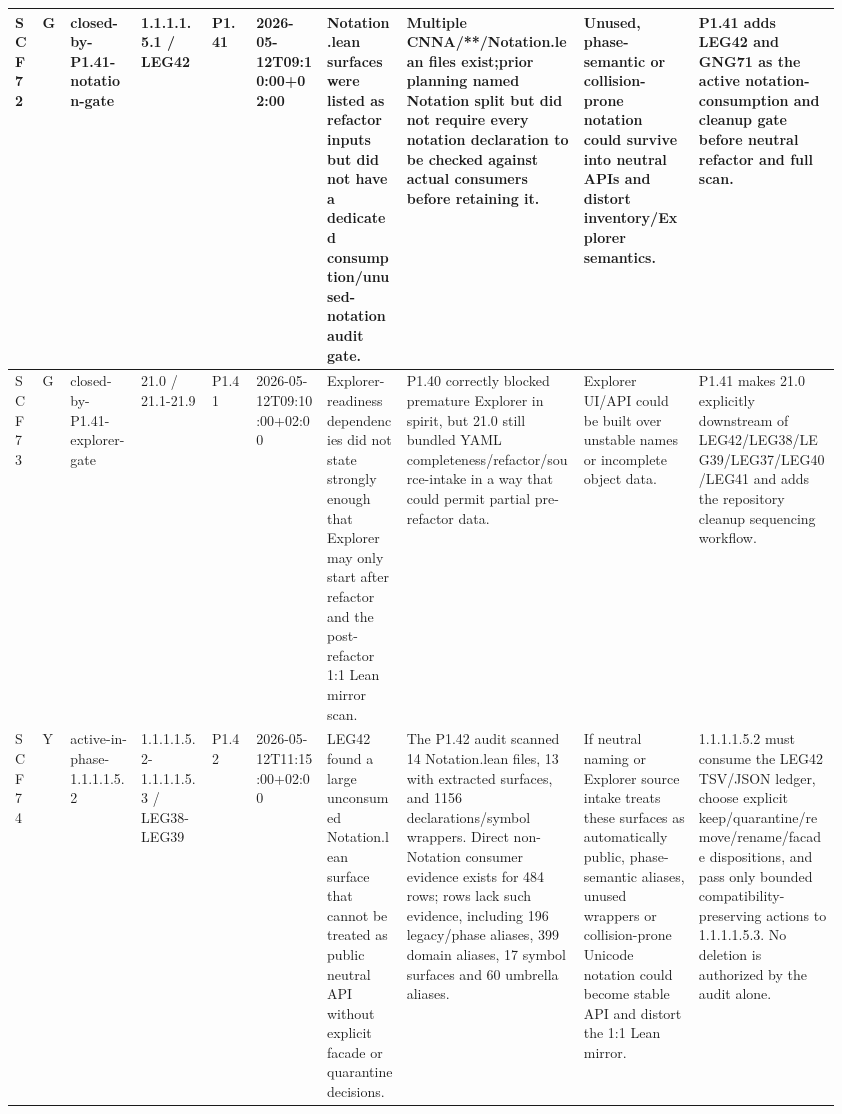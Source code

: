 \begin{longtable}{L{0.03\linewidth} L{0.026\linewidth} L{0.087\linewidth} L{0.085\linewidth} L{0.052\linewidth} L{0.085\linewidth} L{0.095\linewidth} L{0.205\linewidth} L{0.13\linewidth} L{0.165\linewidth}}
SCF72 & G & closed-by-P1.41-notation-gate & 1.1.1.1.5.1 /\allowbreak{} LEG42 & P1.41 & 2026-05-12T09:10:00+02:00 & Notation.lean surfaces were listed as refactor inputs but did not have a dedicated consumption/\allowbreak{}unused-notation audit gate. & Multiple CNNA/\allowbreak{}**/\allowbreak{}Notation.lean files exist;\newline prior planning named Notation split but did not require every notation declaration to be checked against actual consumers before retaining it. & Unused, phase-semantic or collision-prone notation could survive into neutral APIs and distort inventory/\allowbreak{}Explorer semantics. & P1.41 adds LEG42 and GNG71 as the active notation-consumption and cleanup gate before neutral refactor and full scan.\\
\hline
\addlinespace[0.24em]
SCF73 & G & closed-by-P1.41-explorer-gate & 21.0 /\allowbreak{} 21.1-21.9 & P1.41 & 2026-05-12T09:10:00+02:00 & Explorer-readiness dependencies did not state strongly enough that Explorer may only start after refactor and the post-refactor 1:1 Lean mirror scan. & P1.40 correctly blocked premature Explorer in spirit, but 21.0 still bundled YAML completeness/\allowbreak{}refactor/\allowbreak{}source-intake in a way that could permit partial pre-refactor data. & Explorer UI/\allowbreak{}API could be built over unstable names or incomplete object data. & P1.41 makes 21.0 explicitly downstream of LEG42/\allowbreak{}LEG38/\allowbreak{}LEG39/\allowbreak{}LEG37/\allowbreak{}LEG40/\allowbreak{}LEG41 and adds the repository cleanup sequencing workflow.\\
\hline
\addlinespace[0.24em]
SCF74 & Y & active-in-phase-1.1.1.1.5.2 & 1.1.1.1.5.2-1.1.1.1.5.3 /\allowbreak{} LEG38-LEG39 & P1.42 & 2026-05-12T11:15:00+02:00 & LEG42 found a large unconsumed Notation.lean surface that cannot be treated as public neutral API without explicit facade or quarantine decisions. & The P1.42 audit scanned 14 Notation.lean files, 13 with extracted surfaces, and 1156 declarations/\allowbreak{}symbol wrappers. Direct non-Notation consumer evidence exists for 484 rows; rows lack such evidence, including 196 legacy/\allowbreak{}phase aliases, 399 domain aliases, 17 symbol surfaces and 60 umbrella aliases. & If neutral naming or Explorer source intake treats these surfaces as automatically public, phase-semantic aliases, unused wrappers or collision-prone Unicode notation could become stable API and distort the 1:1 Lean mirror. & 1.1.1.1.5.2 must consume the LEG42 TSV/\allowbreak{}JSON ledger, choose explicit keep/\allowbreak{}quarantine/\allowbreak{}remove/\allowbreak{}rename/\allowbreak{}facade dispositions, and pass only bounded compatibility-preserving actions to 1.1.1.1.5.3. No deletion is authorized by the audit alone.\\

\end{longtable}
